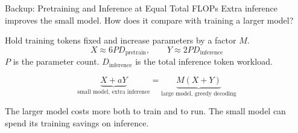 \documentclass[aspectratio=1610,xcolor=dvipsnames,t]{beamer}
\begin{document}
\begin{frame}{Backup: Pretraining and Inference at Equal Total FLOPs}
  Extra inference improves the small model. How does it compare with training a larger model?
  \par\smallskip
  Hold training tokens fixed and increase parameters by a factor $M$.
  \[
    X\approx6PD_{\mathrm{pretrain}},\qquad
    Y\approx2PD_{\mathrm{inference}}
  \]
  $P$ is the parameter count. $D_{\mathrm{inference}}$ is the total inference token workload.
  \par\medskip
  \[
    \underbrace{X+aY}_{\text{small model, extra inference}}
    =\underbrace{M(X+Y)}_{\text{large model, greedy decoding}}
  \]
  \par\medskip
  The larger model costs more both to train and to run. The small model can spend its training savings on inference.
\end{frame}
\end{document}
